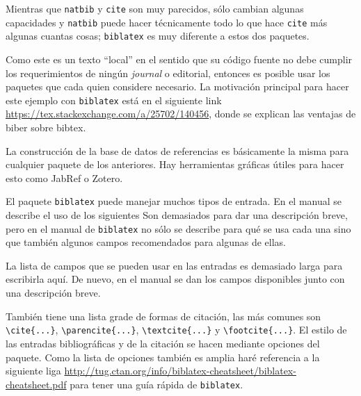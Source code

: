 Mientras que \texttt{natbib} y \texttt{cite} son muy parecidos, sólo cambian
algunas capacidades y \texttt{natbib} puede hacer técnicamente todo lo que
hace \texttt{cite} más algunas cuantas cosas; \texttt{biblatex} es muy
diferente a estos dos paquetes.

Como este es un texto ``local'' en el sentido que su código fuente no debe
cumplir los requerimientos de ningún \textit{journal} o editorial, entonces
es posible usar los paquetes que cada quien considere necesario. La
motivación principal para hacer este ejemplo con \texttt{biblatex} está
en el siguiente link \url{https://tex.stackexchange.com/a/25702/140456},
donde se explican las ventajas de biber sobre bibtex.

La construcción de la base de datos de referencias es básicamente la misma
para cualquier paquete de los anteriores. Hay herramientas gráficas útiles
para hacer esto como JabRef o Zotero.

El paquete \texttt{biblatex} puede manejar muchos tipos de entrada. En el
manual se describe el uso de los siguientes
Son demasiados para dar una descripción breve, pero en el manual de
\texttt{biblatex} no sólo se describe para qué se usa cada una sino que
también algunos campos recomendados para algunas de ellas.

La lista de campos que se pueden usar en las entradas es demasiado larga para
escribirla aquí. De nuevo, en el manual se dan los campos disponibles junto
con una descripción breve.

También tiene una lista grade de formas de citación, las más comunes son
\verb|\cite{...}|, \verb|\parencite{...}|, \verb|\textcite{...}| y
\verb|\footcite{...}|. El estilo de las entradas bibliográficas y de la
citación se hacen mediante opciones del paquete. Como la lista de opciones
también es amplia haré referencia a la siguiente liga
\url{http://tug.ctan.org/info/biblatex-cheatsheet/biblatex-cheatsheet.pdf}
para tener una guía rápida de \texttt{biblatex}.


